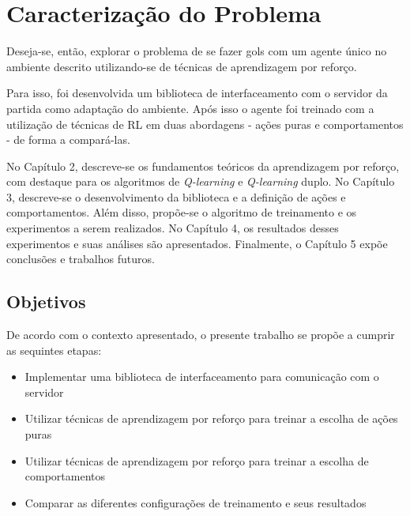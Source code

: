 \section{Caracterização do Problema}
\par Deseja-se, então, explorar o problema de se fazer gols com um agente único no ambiente descrito utilizando-se de técnicas de aprendizagem por reforço.
\par Para isso, foi desenvolvida um biblioteca de interfaceamento com o servidor da partida como adaptação do ambiente. Após isso o agente foi treinado com a utilização de técnicas de RL em duas abordagens - ações puras e comportamentos - de forma a compará-las.
\par No Capítulo 2, descreve-se os fundamentos teóricos da aprendizagem por reforço, com destaque para os algoritmos de \textit{Q-learning} e \textit{Q-learning} duplo. No Capítulo 3, descreve-se o desenvolvimento da biblioteca e a definição de ações e comportamentos. Além disso, propõe-se o algoritmo de treinamento e os experimentos a serem realizados. No Capítulo 4, os resultados desses experimentos e suas análises são apresentados. Finalmente, o Capítulo 5 expõe conclusões e trabalhos futuros.

\subsection{Objetivos}
\par De acordo com o contexto apresentado, o presente trabalho se propõe a cumprir as sequintes etapas:
\begin{itemize}
	\item Implementar uma biblioteca de interfaceamento para comunicação com o servidor
	\item Utilizar técnicas de aprendizagem por reforço para treinar a escolha de ações puras
	\item Utilizar técnicas de aprendizagem por reforço para treinar a escolha de comportamentos
	\item Comparar as diferentes configurações de treinamento e seus resultados
\end{itemize}

